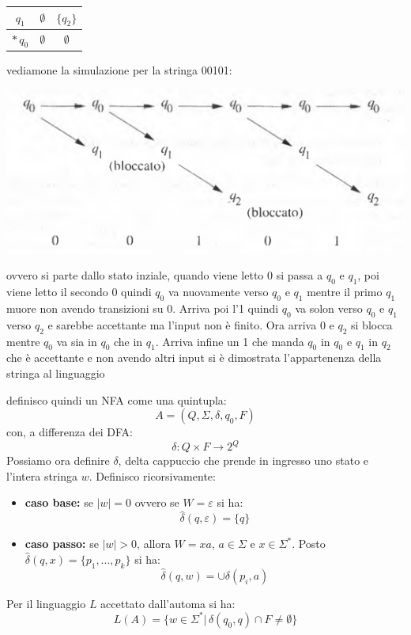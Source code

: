\begin{example}
\begin{center}
\begin{tabular}{c|c|c}
			\hline
			$q_1$       & $\emptyset$   & $\{q_2\}$   \\
			\hline
			$*\, q_0$   & $\emptyset$   & $\emptyset$
		\end{tabular}
	\end{center}
	vediamone la simulazione per la stringa 00101:
	\begin{center}
		\includegraphics[scale=0.7]{img/nfa.png}
	\end{center}
	ovvero si parte dallo stato inziale, quando viene letto 0 si passa a $q_0$ e $q_1$, poi viene letto il secondo 0 quindi $q_0$ va nuovamente verso $q_0$ e $q_1$ mentre il primo $q_1$ muore non avendo transizioni su 0. Arriva poi l'1 quindi $q_0$ va solon verso $q_0$ e $q_1$ verso $q_2$ e sarebbe accettante ma l'input non è finito. Ora arriva 0 e $q_2$ si blocca mentre $q_0$ va sia in $q_0$ che in $q_1$. Arriva infine un 1 che manda $q_0$ in $q_0$ e $q_1$ in $q_2$ che è accettante e non avendo altri input si è dimostrata l'appartenenza della stringa al linguaggio
\end{example}
definisco quindi un NFA come una quintupla:
$$A=(Q,\Sigma,\delta,q_0,F)$$
con, a differenza dei DFA:
$$\delta:Q\times F\to 2^Q$$
Possiamo ora definire {$\delta$}, delta cappuccio che prende in ingresso uno stato e l'intera stringa $w$. Definisco ricorsivamente:
\begin{itemize}
	\item \textbf{caso base:} se $|w|=0$ ovvero se $W=\varepsilon$ si ha:
	      $$\hat{\delta}(q,\varepsilon)=\{q\}$$
	\item \textbf{caso passo:} se $|w|>0$, allora $W=xa$, $a\in\Sigma$ e $x\in\Sigma^*$. Posto $\hat{\delta}(q,x)=\{p_1,...,p_k\}$ si ha:
	      $$\hat{\delta}(q,w)=\cup \delta(p_i,a)$$
\end{itemize}
Per il linguaggio $L$ accettato dall'automa si ha:
$$L(A)=\{w\in \Sigma^*|\, \hat{\delta}(q_0,q)\cap F\neq \emptyset\}$$

